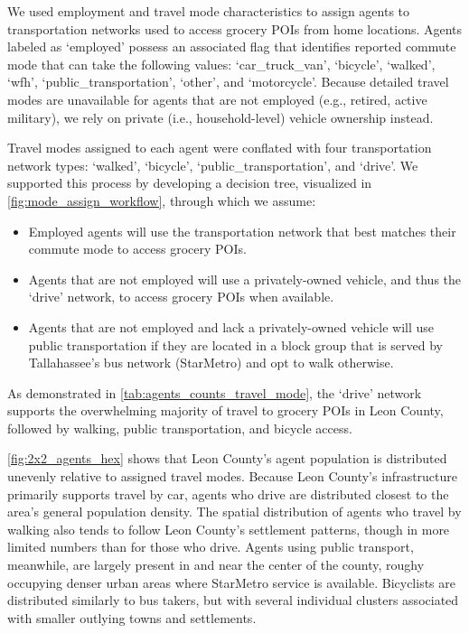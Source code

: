We used employment and travel mode characteristics to assign agents to transportation networks used to access grocery POIs from home locations. Agents labeled as `employed' possess an associated flag that identifies reported commute mode that can take the following values: `car\_truck\_van', `bicycle', `walked', `wfh', `public\_transportation', `other', and `motorcycle'. Because detailed travel modes are unavailable for agents that are not employed (e.g., retired, active military), we rely on private (i.e., household-level) vehicle ownership instead.



Travel modes assigned to each agent were conflated with four transportation network types: `walked', `bicycle', `public\_transportation', and `drive'. We supported this process by developing a decision tree, visualized in \autoref{fig:mode_assign_workflow}, through which we assume:

\begin{itemize}
    \item Employed agents will use the transportation network that best matches their commute mode to access grocery POIs.
    \item Agents that are not employed will use a privately-owned vehicle, and thus the `drive' network, to access grocery POIs when available.
    \item Agents that are not employed and lack a privately-owned vehicle will use public transportation if they are located in a block group that is served by Tallahassee's bus network (StarMetro) and opt to walk otherwise.
\end{itemize}

As demonstrated in \autoref{tab:agents_counts_travel_mode}, the `drive' network supports the overwhelming majority of travel to grocery POIs in Leon County, followed by walking, public transportation, and bicycle access.



\autoref{fig:2x2_agents_hex} shows that Leon County's agent population is distributed unevenly relative to assigned travel modes. Because Leon County's infrastructure primarily supports travel by car, agents who drive are distributed closest to the area's general population density. The spatial distribution of agents who travel by walking also tends to follow Leon County's settlement patterns, though in more limited numbers than for those who drive. Agents using public transport, meanwhile, are largely present in and near the center of the county, roughy occupying denser urban areas where StarMetro service is available. Bicyclists are distributed similarly to bus takers, but with several individual clusters associated with smaller outlying towns and settlements.

